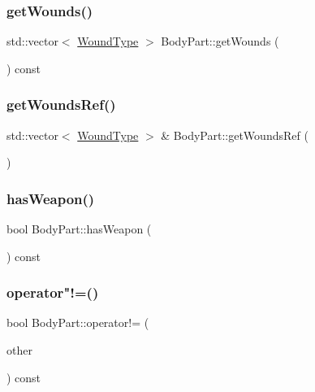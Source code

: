 \subsubsection{\texorpdfstring{get\+Wounds()}{getWounds()}}
{\footnotesize\ttfamily std\+::vector$<$ \mbox{\hyperlink{_enum_types_8hpp_a585daaeecd1f9f1350c24bf0081a734e}{Wound\+Type}} $>$ Body\+Part\+::get\+Wounds (\begin{DoxyParamCaption}{ }\end{DoxyParamCaption}) const}

\mbox{\label{class_body_part_a3363f4c49d3f12175dd17fa01196ac17}} 
\subsubsection{\texorpdfstring{get\+Wounds\+Ref()}{getWoundsRef()}}
{\footnotesize\ttfamily std\+::vector$<$ \mbox{\hyperlink{_enum_types_8hpp_a585daaeecd1f9f1350c24bf0081a734e}{Wound\+Type}} $>$ \& Body\+Part\+::get\+Wounds\+Ref (\begin{DoxyParamCaption}{ }\end{DoxyParamCaption})}

\mbox{\label{class_body_part_aeaa4e41c77eb72031f6482ed4d7e5919}} 
\subsubsection{\texorpdfstring{has\+Weapon()}{hasWeapon()}}
{\footnotesize\ttfamily bool Body\+Part\+::has\+Weapon (\begin{DoxyParamCaption}{ }\end{DoxyParamCaption}) const}

\mbox{\label{class_body_part_aa5df801cc11333d0adeaa5235c70bc7c}} 
\subsubsection{\texorpdfstring{operator"!=()}{operator!=()}}
{\footnotesize\ttfamily bool Body\+Part\+::operator!= (\begin{DoxyParamCaption}\item[{\mbox{\hyperlink{class_body_part}{Body\+Part}} \&}]{other }\end{DoxyParamCaption}) const}

